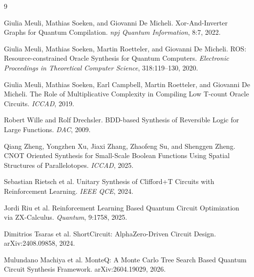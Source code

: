 \documentclass[UTF8,fontset=macnew,11pt]{ctexart}
\begin{document}
\begin{thebibliography}{9}

Giulia Meuli, Mathias Soeken, and Giovanni De Micheli.
Xor-And-Inverter Graphs for Quantum Compilation.
\emph{npj Quantum Information}, 8:7, 2022.

Giulia Meuli, Mathias Soeken, Martin Roetteler, and Giovanni De Micheli.
ROS: Resource-constrained Oracle Synthesis for Quantum Computers.
\emph{Electronic Proceedings in Theoretical Computer Science}, 318:119--130, 2020.

Giulia Meuli, Mathias Soeken, Earl Campbell, Martin Roetteler, and Giovanni De Micheli.
The Role of Multiplicative Complexity in Compiling Low T-count Oracle Circuits.
\emph{ICCAD}, 2019.

Robert Wille and Rolf Drechsler.
BDD-based Synthesis of Reversible Logic for Large Functions.
\emph{DAC}, 2009.

Qiang Zheng, Yongzhen Xu, Jiaxi Zhang, Zhaofeng Su, and Shenggen Zheng.
CNOT Oriented Synthesis for Small-Scale Boolean Functions Using Spatial Structures of Parallelotopes.
\emph{ICCAD}, 2025.

Sebastian Rietsch et al.
Unitary Synthesis of Clifford+T Circuits with Reinforcement Learning.
\emph{IEEE QCE}, 2024.

Jordi Riu et al.
Reinforcement Learning Based Quantum Circuit Optimization via ZX-Calculus.
\emph{Quantum}, 9:1758, 2025.

Dimitrios Tsaras et al.
ShortCircuit: AlphaZero-Driven Circuit Design.
arXiv:2408.09858, 2024.

Mulundano Machiya et al.
MonteQ: A Monte Carlo Tree Search Based Quantum Circuit Synthesis Framework.
arXiv:2604.19029, 2026.

\end{thebibliography}
\end{document}
